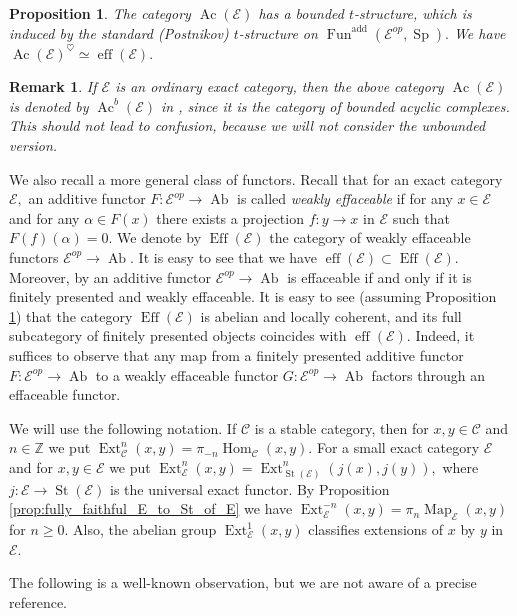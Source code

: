 \documentclass[11pt,leqno]{amsart}
\newtheorem{prop}[theo]{Proposition}
\newtheorem{remark}[theo]{Remark}
\numberwithin{equation}{section}
\def\Z{\mathbb{Z}}
\def\Hom{\operatorname{Hom}}
\def\Map{\operatorname{Map}}
\newcommand{\eff}{\operatorname{eff}}
\newcommand{\Eff}{\operatorname{Eff}}
\newcommand{\St}{\operatorname{St}}
\newcommand{\cC}{{\mathcal C}}
\newcommand{\cE}{{\mathcal E}}
\newcommand{\Fun}{\operatorname{Fun}}
\newcommand{\Ab}{\operatorname{Ab}}
\newcommand{\Ext}{\operatorname{Ext}}
\newcommand{\Sp}{\operatorname{Sp}}
\newcommand{\add}{\operatorname{add}}
\newcommand{\Ac}{\operatorname{Ac}}
\begin{document}
\begin{prop}\cite[Lemma 1.2]{Nee21} \cite[Proposition G.7]{E24} \cite[Corollary 3.12]{SW26} \label{prop:t_structure_on_Ac}
The category $\Ac(\cE)$ has a bounded $t$-structure, which is induced by the standard (Postnikov) $t$-structure on $\Fun^{\add}(\cE^{op},\Sp).$ We have $\Ac(\cE)^{\heartsuit}\simeq \eff(\cE).$
\end{prop}

\begin{remark}
If $\cE$ is an ordinary exact category, then the above category $\Ac(\cE)$ is denoted by $\Ac^b(\cE)$ in \cite{Nee21}, since it is the category of bounded acyclic complexes. This should not lead to confusion, because we will not consider the unbounded version.
\end{remark}

 We also recall a more general class of functors. Recall that for an exact category $\cE,$ an additive functor $F:\cE^{op}\to\Ab$ is called {\it weakly effaceable} if for any $x\in\cE$ and for any $\alpha\in F(x)$ there exists a projection $f:y\to x$ in $\cE$ such that $F(f)(\alpha) = 0.$ We denote by $\Eff(\cE)$ the category of weakly effaceable functors $\cE^{op}\to\Ab.$ It is easy to see that we have $\eff(\cE)\subset\Eff(\cE).$ Moreover, by \cite[Proposition 3.9]{SW26} an additive functor $\cE^{op}\to\Ab$ is effaceable if and only if it is finitely presented and weakly effaceable. It is easy to see (assuming Proposition \ref{prop:t_structure_on_Ac}) that the category $\Eff(\cE)$ is abelian and locally coherent, and its full subcategory of finitely presented objects coincides with $\eff(\cE).$ Indeed, it suffices to observe that any map from a finitely presented additive functor $F:\cE^{op}\to\Ab$ to a weakly effaceable functor $G:\cE^{op}\to\Ab$ factors through an effaceable functor.
 
We will use the following notation. If $\cC$ is a stable category, then for $x,y\in\cC$ and $n\in\Z$ we put $\Ext^n_{\cC}(x,y)=\pi_{-n}\Hom_{\cC}(x,y).$ For a small exact category $\cE$ and for $x,y\in\cE$ we put $\Ext^n_{\cE}(x,y)=\Ext^n_{\St(\cE)}(j(x),j(y)),$ where $j:\cE\to\St(\cE)$ is the universal exact functor. By Proposition \ref{prop:fully_faithful_E_to_St_of_E} we have $\Ext^{-n}_{\cE}(x,y)=\pi_n\Map_{\cE}(x,y)$ for $n\geq 0.$ Also, the abelian group $\Ext^1_{\cE}(x,y)$ classifies extensions of $x$ by $y$ in $\cE.$

The following is a well-known observation, but we are not aware of a precise reference.
\end{document}
